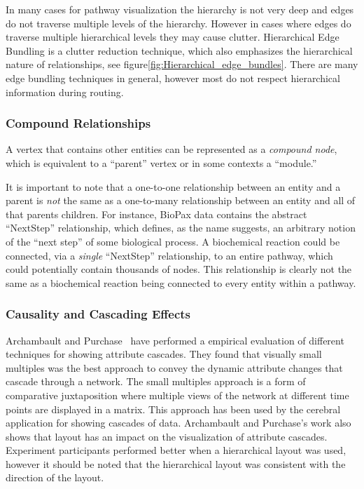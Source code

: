 \documentclass[journal]{vgtc}                %
\begin{document}
In many cases for pathway visualization the hierarchy is not very deep and edges do not traverse multiple levels of the hierarchy.
However in cases where edges do traverse  multiple hierarchical levels they may cause clutter.
Hierarchical Edge Bundling \cite{Holten2006} is a clutter reduction technique, which also emphasizes the hierarchical nature of relationships, see figure\ref{fig:Hierarchical_edge_bundles}. There are many edge bundling techniques in general, however most do not respect hierarchical information during routing.


\subsubsection{Compound Relationships}

A vertex that contains other entities can be represented as a \textit{compound node}, which is equivalent to a ``parent'' vertex or in some contexts a ``module.''

It is important to note that a one-to-one relationship between an entity and a parent is \textit{not} the same as a one-to-many relationship between an entity and all of that parents children.
For instance, BioPax data contains the abstract ``NextStep'' relationship, which defines, as the name suggests, an arbitrary notion of the ``next step'' of some biological process.
A biochemical reaction could be connected, via a \textit{single} ``NextStep'' relationship, to an entire pathway, which could potentially contain thousands of nodes.
This relationship is clearly not the same as a biochemical reaction being connected to every entity within a pathway.

\subsubsection{Causality and Cascading Effects}


Archambault and Purchase~\cite{Archambault2016} have performed a empirical evaluation of different techniques for showing attribute cascades.
They found that visually small multiples was the best approach to convey the dynamic attribute changes that cascade through a network.
The small multiples approach is a form of comparative juxtaposition where multiple views of the network at different time points are displayed in a matrix.
This approach has been used by the cerebral application for showing cascades of data.
Archambault and Purchase's work also shows that layout has an impact on the visualization of attribute cascades.
Experiment participants performed better when a hierarchical layout was used, however it should be noted that the hierarchical layout was consistent with the direction of the layout.
\end{document}
